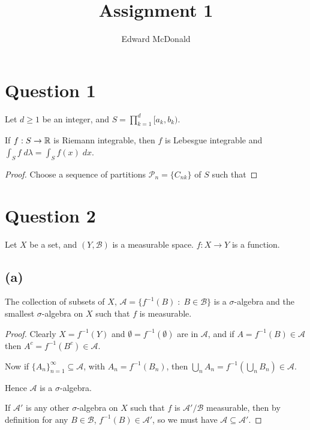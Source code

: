 \documentclass{unswmaths}
\begin{document}
\subject{Measure Theory}
\author{Edward McDonald}
\title{Assignment 1}


\setlength\parindent{0pt}


\newcommand{\Bor}{\mathcal{B}(\Rl)}
\newcommand{\sdiff}{\bigtriangleup}

\unswtitle{}


\section*{Question 1}
Let $d \geq 1$ be an integer, and $S = \prod_{k=1}^d [a_k,b_k)$.
\begin{theorem}
    If $f:S\rightarrow \mathbb{R}$ is Riemann integrable, then $f$ is Lebesgue integrable
    and $\int_S f\;d\lambda = \int_S f(x)\;dx$.
\end{theorem}
\begin{proof}
    Choose a sequence of partitions $\mathcal{P}_n = \{C_{nk}\}$
    of $S$ such that 
\end{proof}



\section*{Question 2}
Let $X$ be a set, and $(Y,\mathcal{B})$ is a measurable space. $f:X\rightarrow Y$
is a function.
\subsection*{(a)}
\begin{lemma}
    The collection of subsets of $X$, $\mathcal{A} = \{f^{-1}(B)\;:\;B \in \mathcal{B}\}$
    is a $\sigma$-algebra and the smallest $\sigma$-algebra on $X$
    such that $f$ is measurable.
\end{lemma}
\begin{proof}
    Clearly $X = f^{-1}(Y)$ and $\emptyset = f^{-1}(\emptyset)$ are in $\mathcal{A}$,
    and if $A = f^{-1}(B) \in \mathcal{A}$ then $A^c = f^{-1}(B^c) \in \mathcal{A}$.
    
    
    Now if $\{A_n\}_{n=1}^{\infty} \subseteq \mathcal{A}$, with $A_n = f^{-1}(B_n)$,
    then $\bigcup_n A_n = f^{-1}(\bigcup_n B_n) \in \mathcal{A}$.
    
    Hence $\mathcal{A}$ is a $\sigma$-algebra.
    
    If $\mathcal{A}'$ is any other $\sigma$-algebra on $X$ such that $f$
    is $\mathcal{A}'/\mathcal{B}$ measurable, then by definition
    for any $B \in \mathcal{B}$, $f^{-1}(B) \in \mathcal{A}'$, so    
    we
    must have $\mathcal{A} \subseteq \mathcal{A}'$.
        
    
\end{proof}
\end{document}
